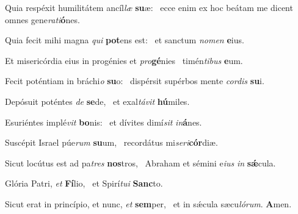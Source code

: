 \item Quia respéxit humilitátem ancíl\textit{læ} \textbf{su}æ:~\psstar{} ecce enim ex hoc beátam me dicent omnes gene\textit{rati}\textbf{ó}nes.

\item Quia fecit mihi magna \textit{qui} \textbf{pot}ens est:~\psstar{} et sanctum \textit{nomen} \textbf{e}ius.

\item Et misericórdia eius in progénies et \textit{pro}\textbf{gé}nies~\psstar{} timén\textit{tibus} \textbf{e}um.

\item Fecit poténtiam in bráchi\textit{o} \textbf{su}o:~\psstar{} dispérsit supérbos mente \textit{cordis} \textbf{su}i.

\item Depósuit poténtes \textit{de} \textbf{se}de,~\psstar{} et exal\textit{távit} \textbf{hú}miles.

\item Esuriéntes implé\textit{vit} \textbf{bo}nis:~\psstar{} et dívites dimí\textit{sit} \textit{in}\textbf{á}nes.

\item Suscépit Israel púe\textit{rum} \textbf{su}um,~\psstar{} recordátus mi\textit{seri}\textbf{cór}diæ.

\item Sicut locútus est ad pa\textit{tres} \textbf{nos}tros,~\psstar{} Abraham et sémini e\textit{ius} \textit{in} \textbf{sǽ}cula.

\item Glória Patri, \textit{et} \textbf{Fí}lio,~\psstar{} et Spirí\textit{tui} \textbf{Sanc}to.

\item Sicut erat in princípio, et nunc, \textit{et} \textbf{sem}per,~\psstar{} et in sǽcula sæcu\textit{lórum}. \textbf{A}men.